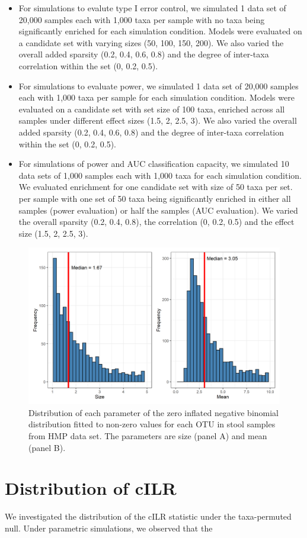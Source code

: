 \documentclass{article}
\begin{document}
\begin{itemize}
    \item For simulations to evalute type I error control, we simulated 1 data set of 20,000 samples each with 1,000 taxa per sample with no taxa being significantly enriched for each simulation condition. Models were evaluated on a candidate set with varying sizes (50, 100, 150, 200). We also varied the overall added sparsity (0.2, 0.4, 0.6, 0.8) and the degree of inter-taxa correlation within the set (0, 0.2, 0.5).  
    \item For simulations to evaluate power, we simulated 1 data set of 20,000 samples each with 1,000 taxa per sample for each simulation condition. Models were evaluated on a candidate set with set size of 100 taxa, enriched across all samples under different effect sizes (1.5, 2, 2.5, 3). We also varied the overall added sparsity (0.2, 0.4, 0.6, 0.8) and the degree of inter-taxa correlation within the set (0, 0.2, 0.5). 
    \item For simulations of power and AUC classification capacity, we simulated 10 data sets of 1,000 samples each with 1,000 taxa for each simulation condition. We evaluated enrichment for one candidate set with size of 50 taxa per set.  per sample with one set of 50 taxa being significantly enriched in either all samples (power evaluation) or half the samples (AUC evaluation). We varied the overall sparsity (0.2, 0.4, 0.8), the correlation (0, 0.2, 0.5) and the effect size (1.5, 2, 2.5, 3).
\end{itemize}

\begin{figure}[h]
    \centering
    \includegraphics[width=0.6\linewidth]{figures/HMP_fit_nonzero.png}
    \caption{Distribution of each parameter of the zero inflated negative binomial distribution fitted to non-zero values for each OTU in stool samples from HMP data set. The parameters are size (panel A) and mean (panel B).}
\end{figure}

\section{Distribution of cILR}
We investigated the distribution of the cILR statistic under the taxa-permuted null. Under parametric simulations, we observed that the 
\end{document}

